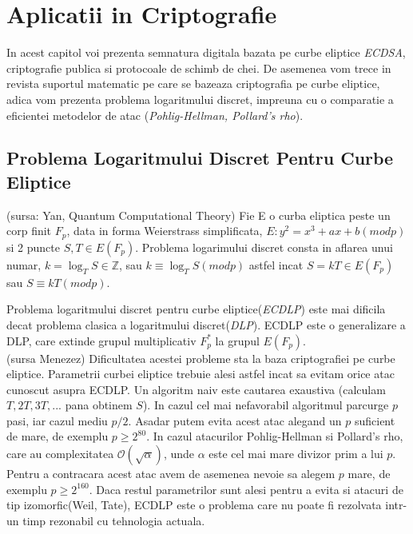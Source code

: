 \chapter{Aplicatii in Criptografie} 

In acest capitol voi prezenta semnatura digitala bazata pe curbe eliptice \textit{ECDSA}, criptografie publica si protocoale de schimb de chei. De asemenea vom trece in revista suportul matematic pe care se bazeaza criptografia pe curbe eliptice, adica vom prezenta problema logaritmului discret, impreuna cu o comparatie a eficientei metodelor de atac (\textit{Pohlig-Hellman, Pollard's rho}).

\section{Problema Logaritmului Discret Pentru Curbe Eliptice}
\label{sec:sec01}

\begin{dfn}
(sursa: Yan, Quantum Computational Theory)
Fie E o curba eliptica peste un corp finit $F_p$, data in forma Weierstrass simplificata, 
$E: y^2 = x^3 + ax + b (mod p)$ si 2 puncte $S, T\in E(F_p)$. Problema logarimului discret consta in aflarea unui numar, $k = \log_T S \in \mathbb{Z}$, sau $k \equiv \log_T S (mod p)$ astfel incat $S = kT \in E(F_p)$ sau $S \equiv kT (mod p)$. 
\end{dfn}

Problema logaritmului discret pentru curbe eliptice(\textit{ECDLP}) este mai dificila decat problema clasica a logaritmului discret(\textit{DLP}). ECDLP este o generalizare a DLP, care extinde grupul multiplicativ $F^{*}_{p}$ la grupul $E(F_p)$.
\\(sursa Menezez) Dificultatea acestei probleme sta la baza criptografiei pe curbe eliptice. Parametrii curbei eliptice trebuie alesi astfel incat sa evitam orice atac cunoscut asupra ECDLP. Un algoritm naiv este cautarea exaustiva (calculam $T, 2T, 3T, ...$ pana obtinem $S$). In cazul cel mai nefavorabil algoritmul parcurge $p$ pasi, iar cazul mediu $p/2$. Asadar putem evita acest atac alegand un $p$ suficient de mare, de exemplu $p\geq 2^{80}$. In cazul atacurilor Pohlig-Hellman si Pollard's rho, care au complexitatea $\mathcal{O}(\sqrt{\alpha})$, unde $\alpha$ este cel mai mare divizor prim a lui $p$. Pentru a contracara acest atac avem de asemenea nevoie sa alegem $p$ mare, de exemplu $p\geq 2^{160}$. Daca restul parametrilor sunt alesi pentru a evita si atacuri de tip izomorfic(Weil, Tate), ECDLP este o problema care nu poate fi rezolvata intr-un timp rezonabil cu tehnologia actuala.

